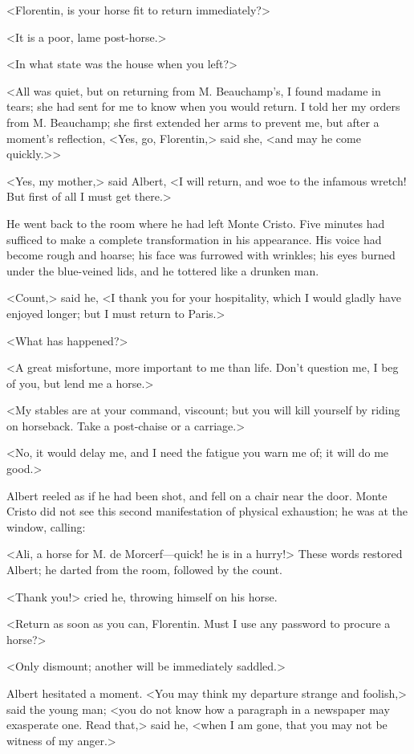  <Florentin, is your horse fit to return immediately?> 

 <It is a poor, lame post-horse.> 

 <In what state was the house when you left?> 

 <All was quiet, but on returning from M. Beauchamp's, I found madame in tears; she had sent for me to know when you would return. I told her my orders from M. Beauchamp; she first extended her arms to prevent me, but after a moment's reflection, <Yes, go, Florentin,> said she, <and may he come quickly.>> 

 <Yes, my mother,> said Albert, <I will return, and woe to the infamous wretch! But first of all I must get there.> 

 He went back to the room where he had left Monte Cristo. Five minutes had sufficed to make a complete transformation in his appearance. His voice had become rough and hoarse; his face was furrowed with wrinkles; his eyes burned under the blue-veined lids, and he tottered like a drunken man. 

 <Count,> said he, <I thank you for your hospitality, which I would gladly have enjoyed longer; but I must return to Paris.> 

 <What has happened?> 

 <A great misfortune, more important to me than life. Don't question me, I beg of you, but lend me a horse.> 

 <My stables are at your command, viscount; but you will kill yourself by riding on horseback. Take a post-chaise or a carriage.> 

 <No, it would delay me, and I need the fatigue you warn me of; it will do me good.> 

 Albert reeled as if he had been shot, and fell on a chair near the door. Monte Cristo did not see this second manifestation of physical exhaustion; he was at the window, calling: 

 <Ali, a horse for M. de Morcerf—quick! he is in a hurry!>  These words restored Albert; he darted from the room, followed by the count. 

 <Thank you!> cried he, throwing himself on his horse. 

 <Return as soon as you can, Florentin. Must I use any password to procure a horse?> 

 <Only dismount; another will be immediately saddled.> 

 Albert hesitated a moment. <You may think my departure strange and foolish,> said the young man; <you do not know how a paragraph in a newspaper may exasperate one. Read that,> said he, <when I am gone, that you may not be witness of my anger.> 

